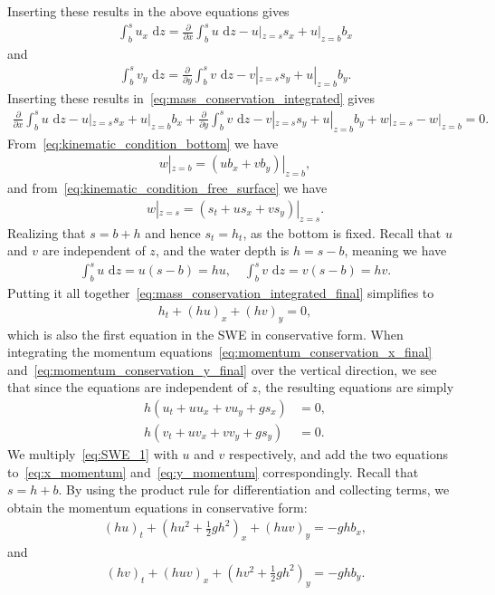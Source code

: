 Inserting these results in the above equations gives
\begin{align}
    \int_{b}^{s} u_x \text{ d} z =  \frac{\partial}{\partial x}  \int_{b}^{s} u \text{ d} z  - u|_{z = s} s_x + u|_{z = b} b_x
\end{align}
and 
\begin{align}
    \int_{b}^{s} v_y \text{ d} z = \frac{\partial}{\partial y}  \int_{b}^{s} v \text{ d} z  - v|_{z = s} s_y + u|_{z = b} b_y.
\end{align}
Inserting these results in~\eqref{eq:mass_conservation_integrated} gives
\begin{align}\label{eq:mass_conservation_integrated_final}
    \frac{\partial}{\partial x}  \int_{b}^{s} u \text{ d} z  - u|_{z = s} s_x + u|_{z = b} b_x
    + \frac{\partial}{\partial y}  \int_{b}^{s} v \text{ d} z  - v|_{z = s} s_y + u|_{z = b} b_y
    + w|_{z = s} - w|_{z = b} = 0.
\end{align}
From~\eqref{eq:kinematic_condition_bottom} we have
\begin{align}
    w|_{z = b} = (u b_x + v b_y)|_{z = b},
\end{align}
and from~\eqref{eq:kinematic_condition_free_surface} we have
\begin{align}
    w|_{z = s} = (s_t + u s_x + v s_y)|_{z = s}.
\end{align}
Realizing that $s = b + h$ and hence $s_t = h_t$, as the bottom is fixed.
Recall that $u$ and $v$ are independent of $z$, and the water depth is $h = s - b$, meaning we have
\begin{align*}
    \int_{b}^{s} u \text{ d} z = u(s - b) = hu, \quad \int_{b}^{s} v \text{ d} z = v(s - b) = hv.
\end{align*}
Putting it all together~\eqref{eq:mass_conservation_integrated_final} simplifies to
\begin{align}\label{eq:SWE_1}
    h_t + {(hu)}_x + {(hv)}_y = 0,
\end{align}
which is also the first equation in the SWE in conservative form.
When integrating the momentum equations~\eqref{eq:momentum_conservation_x_final} and~\eqref{eq:momentum_conservation_y_final} over the vertical direction, we see that since the equations are independent of $z$, the resulting equations are simply
\begin{align}
    h(u_t + uu_x + vu_y + g s_x) &= 0, \label{eq:x_momentum} \\
    h(v_t + uv_x + vv_y + g s_y) &= 0. \label{eq:y_momentum}
\end{align}
We multiply~\eqref{eq:SWE_1} with $u$ and $v$ respectively, and add the two equations to~\eqref{eq:x_momentum} and~\eqref{eq:y_momentum} correspondingly.
Recall that $s = h + b$. 
By using the product rule for differentiation and collecting terms, we obtain the momentum equations in conservative form:
\begin{align*}
    {(hu)}_t + {(hu^2 + \frac{1}{2}gh^2)}_x + {(huv)}_y = -gh b_x,
\end{align*}
and 
\begin{align*}
    {(hv)}_t + {(huv)}_x + {(hv^2 + \frac{1}{2}gh^2)}_y = -gh b_y.
\end{align*}



